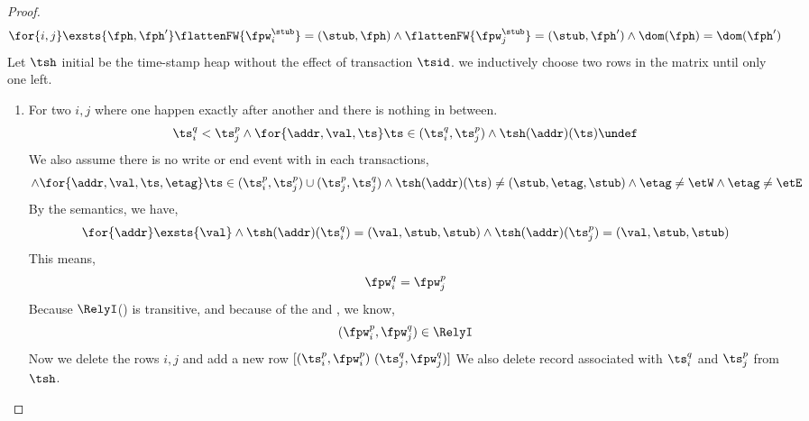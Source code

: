 \begin{proof}
\[
    \for{i,j} \exsts{\fph, \fph'} 
    \flattenFW{\fpw_{i}^{\stub}} = (\stub, \fph) 
    \land \flattenFW{\fpw_{j}^{\stub}} = (\stub, \fph')
    \land \dom(\fph) = \dom(\fph')
\]
Let \( \tsh \) initial be the time-stamp heap without the effect of transaction \( \tsid \).
we inductively choose two rows in the matrix until only one left.
\begin{enumerate}
\item For two \( i,j \) where one happen exactly after another and there is nothing in between.
\[
\ts_{i}^{q} < \ts_{j}^{p}
\land \for{\addr,\val, \ts}                             
\ts \in (\ts_{i}^{q}, \ts_{j}^{p} ) 
\land \tsh(\addr)(\ts)\undef
\]
We also assume there is no write or end event with in each transactions,
\[
\land \for{\addr,\val, \ts, \etag}                             
\ts \in (\ts_{i}^{p}, \ts_{j}^{p} )  \cup (\ts_{j}^{p}, \ts_{j}^{q})
\land \tsh(\addr)(\ts) \neq (\stub, \etag, \stub)
\land \etag \neq \etW
\land \etag \neq \etE
\]
By the semantics, we  have,
\[
\for{\addr} \exsts{\val} 
\land \tsh(\addr)(\ts_{i}^{q}) = (\val, \stub, \stub)
\land \tsh(\addr)(\ts_{j}^{p}) = (\val, \stub, \stub)
\]
This means,
\[
    \fpw_{i}^{q} = \fpw_{j}^{p}
\]
Because \( \RelyI \)() is transitive, and because of the \ih and , we know,
\[
    (\fpw_{i}^{p}, \fpw_{j}^{q}) \in \RelyI
\]
Now we delete the rows \( i,j \) and add a new row \( [ (\ts_{i}^{p}, \fpw_{i}^{p}) \  (\ts_{j}^{q}, \fpw_{j}^{q}) ] \)
We also delete record associated with \( \ts_{i}^{q} \) and \( \ts_{j}^{p} \) from \( \tsh \).


\end{enumerate}
\end{proof}
